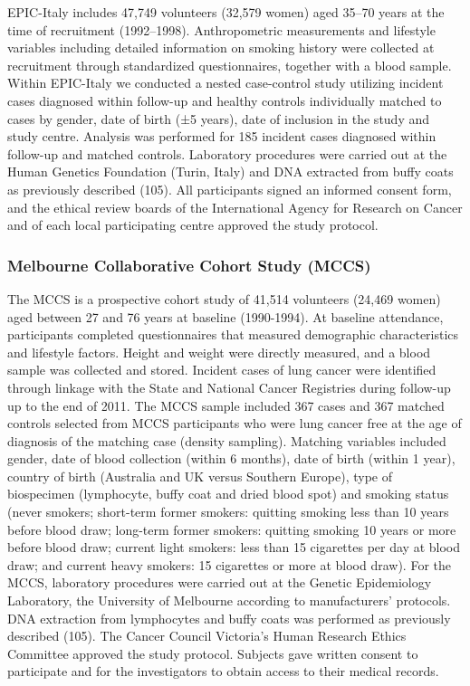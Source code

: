 \documentclass[11pt,twoside]{bristolthesis}
\begin{document}
EPIC-Italy includes 47,749 volunteers (32,579 women) aged 35--70 years at the time of recruitment (1992--1998). Anthropometric measurements and lifestyle variables including detailed information on smoking history were collected at recruitment through standardized questionnaires, together with a blood sample. Within EPIC-Italy we conducted a nested case-control study utilizing incident cases diagnosed within follow-up and healthy controls individually matched to cases by gender, date of birth (±5 years), date of inclusion in the study and study centre. Analysis was performed for 185 incident cases diagnosed within follow-up and matched controls. Laboratory procedures were carried out at the Human Genetics Foundation (Turin, Italy) and DNA extracted from buffy coats as previously described (105). All participants signed an informed consent form, and the ethical review boards of the International Agency for Research on Cancer and of each local participating centre approved the study protocol.

\hypertarget{melbourne-collaborative-cohort-study-mccs}{%
\subsubsection{Melbourne Collaborative Cohort Study (MCCS)}\label{melbourne-collaborative-cohort-study-mccs}}

The MCCS is a prospective cohort study of 41,514 volunteers (24,469 women) aged between 27 and 76 years at baseline (1990-1994). At baseline attendance, participants completed questionnaires that measured demographic characteristics and lifestyle factors. Height and weight were directly measured, and a blood sample was collected and stored. Incident cases of lung cancer were identified through linkage with the State and National Cancer Registries during follow-up up to the end of 2011. The MCCS sample included 367 cases and 367 matched controls selected from MCCS participants who were lung cancer free at the age of diagnosis of the matching case (density sampling). Matching variables included gender, date of blood collection (within 6 months), date of birth (within 1 year), country of birth (Australia and UK versus Southern Europe), type of biospecimen (lymphocyte, buffy coat and dried blood spot) and smoking status (never smokers; short-term former smokers: quitting smoking less than 10 years before blood draw; long-term former smokers: quitting smoking 10 years or more before blood draw; current light smokers: less than 15 cigarettes per day at blood draw; and current heavy smokers: 15 cigarettes or more at blood draw). For the MCCS, laboratory procedures were carried out at the Genetic Epidemiology Laboratory, the University of Melbourne according to manufacturers' protocols. DNA extraction from lymphocytes and buffy coats was performed as previously described (105). The Cancer Council Victoria's Human Research Ethics Committee approved the study protocol. Subjects gave written consent to participate and for the investigators to obtain access to their medical records.
\end{document}
